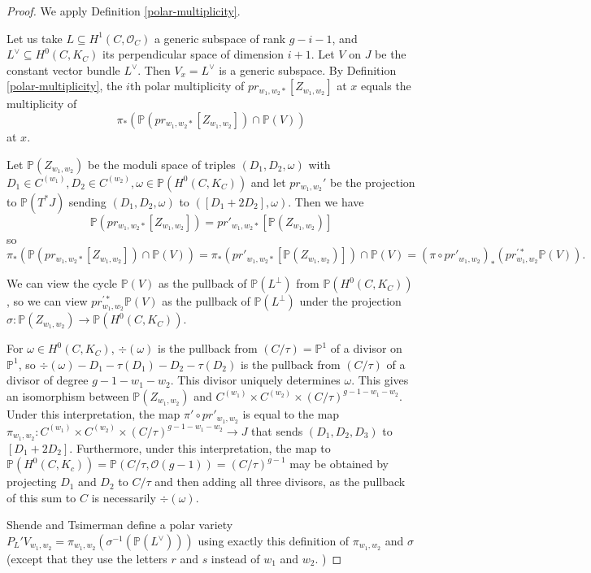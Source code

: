 \begin{proof}  We apply Definition \ref{polar-multiplicity}.

Let us take $L \subseteq  H^1(C, \mathcal O_C)$ a generic subspace of rank $g-i-1$, and $L^\vee \subseteq H^0(C, K_C)$ its perpendicular space of dimension $i+1$. Let $V$ on $J$ be the constant vector bundle $L^\vee$. Then $V_x = L^\vee$ is a generic subspace. By Definition \ref{polar-multiplicity}, the $i$th polar multiplicity of $pr_{w_1,w_2 *} [ Z_{w_1,w_2} ]$ at $x$ equals the multiplicity of \[ \pi_* ( \mathbb P ( pr_{w_1,w_2 *} [ Z_{w_1,w_2} ] ) \cap \mathbb P(V)) \] at $x$.

Let $ \mathbb P ( Z_{w_1,w_2} )$ be the moduli space of triples $(D_1,D_2,\omega)$ with $D_1 \in C^{(w_1)}, D_2\in C^{(w_2)}, \omega \in \mathbb P ( H^0(C, K_C))$ and let $pr_{w_1,w_2}' $ be the projection to $\mathbb P (T^* J)$ sending $(D_1,D_2,\omega)$ to $([D_1+2D_2],\omega)$. Then we have \[ \mathbb P ( pr_{w_1,w_2 *} [ Z_{w_1,w_2} ] ) = pr'_{w_1,w_2 *} [\mathbb P(Z_{w_1,w_2} )] \] so
\[ \pi_* ( \mathbb P ( pr_{w_1,w_2 *} [ Z_{w_1,w_2} ] ) \cap \mathbb P(V)) = \pi_* (  pr'_{w_1,w_2 *} [\mathbb P(Z_{w_1,w_2} )] ) \cap \mathbb P(V) =( \pi \circ pr'_{w_1,w_2})_* (  pr_{w_1,w_2}^{'*} \mathbb P(V) ).\]

We can view the cycle $\mathbb P(V)$ as the pullback of $\mathbb P(L^\perp)$ from $\mathbb P(H^0(C,K_C))$, so we can view $pr_{w_1,w_2}^{'*} \mathbb P(V)$ as the pullback of $\mathbb P(L^\perp)$ under the projection $\sigma: \mathbb P ( Z_{w_1,w_2} )\to \mathbb P(H^0(C,K_C))$.

For $\omega \in H^0(C, K_C)$, $\div(\omega)$ is the pullback from $(C/\tau)= \mathbb P^1$ of a divisor on $\mathbb P^1$, so $\div(\omega)- D_1 -\tau(D_1) - D_2 -\tau(D_2)$ is the pullback from $(C/\tau)$ of a divisor of degree $g-1-w_1 -w_2$. This divisor uniquely determines $\omega$. This gives an isomorphism between $\mathbb P ( Z_{w_1,w_2}) $ and $C^{(w_1)} \times C^{(w_2)} \times (C/\tau)^{g-1-w_1-w_2}$. Under this interpretation, the map $\pi' \circ  pr'_{w_1,w_2}$ is equal to the map $\pi_{w_1,w_2}:  C^{(w_1)} \times C^{(w_2)} \times (C/\tau)^{g-1-w_1-w_2} \to J$ that sends $(D_1,D_2, D_3) $ to $ [D_1+2D_2] $. Furthermore, under this interpretation, the map to $\mathbb P ( H^0(C, K_c)) = \mathbb P ( C/\tau, \mathcal O(g-1)) = (C/\tau)^{g-1}$ may be obtained by projecting $D_1$ and $D_2$ to $ C/\tau$ and then adding all three divisors, as the pullback of this sum to $C$ is necessarily $\div(\omega)$.

Shende and Tsimerman define a polar variety $P_L'V_{w_1,w_2} = \pi_{w_1,w_2} (\sigma^{-1} (\mathbb P(L^\vee)))$ using exactly this definition of $\pi_{w_1,w_2}$ and $\sigma$ (except that they use the letters $r$ and $s$ instead of $w_1$ and $w_2$. )


\end{proof}
